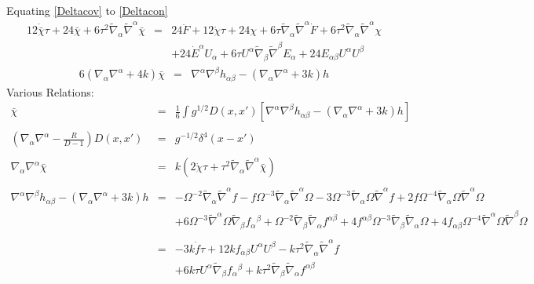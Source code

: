 \documentclass[10pt,letterpaper]{article}
\numberwithin{equation}{section}
\begin{document}
Equating \eqref{Deltacov} to \eqref{Deltacon}
\begin{eqnarray}
12  \dot{\bar \chi} \tau + 24 \bar \chi + 6 \tau^2 \tilde{\nabla}_{\alpha }\tilde{\nabla}^{\alpha }\bar \chi
&=&  24 \ddot{F} + 12 \dot{\chi} \tau + 24 \chi + 6 \tau \tilde{\nabla}_{\alpha}\tilde{\nabla}^{\alpha}\dot{F} + 6 \tau^2 \tilde{\nabla}_{\alpha}\tilde{\nabla}^{\alpha}\chi
\nonumber\\ 
&&+24 \dot{E}^{\alpha} U_{\alpha} + 6 \tau U^{\alpha} \tilde{\nabla}_{\beta}\tilde{\nabla}^{\beta}E_{\alpha}
+24 E_{\alpha \beta} U^{\alpha} U^{\beta}
\end{eqnarray}
\begin{eqnarray}
6(\nabla_\alpha \nabla^\alpha + 4k)\bar\chi &=& \nabla^\alpha\nabla^\beta h_{\alpha\beta} - (\nabla_\alpha\nabla^\alpha  + 3k) h
\end{eqnarray}
Various Relations:
\begin{eqnarray}
\bar\chi &=& \frac{1}{6}\int g^{1/2} D(x,x') \left[  \nabla^\alpha\nabla^\beta h_{\alpha\beta} - (\nabla_\alpha\nabla^\alpha  + 3k) h\right]
\\ \nonumber\\
\left(\nabla_\alpha\nabla^\alpha -\frac{R}{D-1}\right)D(x,x') &=& g^{-1/2} \delta^4(x-x')
\\ \nonumber\\
\nabla_\alpha\nabla^\alpha \bar\chi &=& k( 
2  \dot{\chi} \tau +  \tau^2 \tilde{\nabla}_{\alpha }\tilde{\nabla}^{\alpha }\bar \chi )
\\ \nonumber\\
\nabla^\alpha\nabla^\beta h_{\alpha\beta} - (\nabla_\alpha\nabla^\alpha  + 3k) h
&=&- \Omega^{-2} \tilde{\nabla}_{\alpha }\tilde{\nabla}^{\alpha }f
-  f \Omega^{-3} \tilde{\nabla}_{\alpha }\tilde{\nabla}^{\alpha }\Omega
- 3 \Omega^{-3} \tilde{\nabla}_{\alpha }\Omega \tilde{\nabla}^{\alpha }f
+ 2 f \Omega^{-4} \tilde{\nabla}_{\alpha }\Omega \tilde{\nabla}^{\alpha }\Omega
\nonumber\\
&& + 6 \Omega^{-3} \tilde{\nabla}^{\alpha }\Omega \tilde{\nabla}_{\beta }f_{\alpha }{}^{\beta }
+ \Omega^{-2} \tilde{\nabla}_{\beta }\tilde{\nabla}_{\alpha }f^{\alpha \beta }
+ 4 f^{\alpha \beta } \Omega^{-3} \tilde{\nabla}_{\beta }\tilde{\nabla}_{\alpha }\Omega
+ 4 f_{\alpha \beta } \Omega^{-4} \tilde{\nabla}^{\alpha }\Omega \tilde{\nabla}^{\beta }\Omega
\nonumber\\ \nonumber\\
 &=&-3 k \dot{f} \tau + 12 k f_{\alpha \beta } U^{\alpha } U^{\beta } -  k \tau^2 \tilde \nabla_{\alpha }\tilde \nabla^{\alpha }f
\nonumber\\
&& + 6 k \tau U^{\alpha } \tilde\nabla_{\beta }f_{\alpha }{}^{\beta } + k \tau^2 \tilde \nabla_{\beta }\tilde \nabla_{\alpha }f^{\alpha \beta }
\end{eqnarray}

\end{document}
